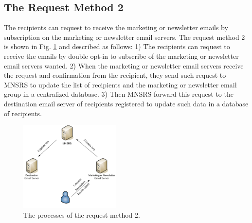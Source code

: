 \documentclass[conference]{IEEEtran}
\begin{document}
\subsection{The Request Method 2}
The recipients can request to receive the marketing or newsletter emails by subscription on the marketing or newsletter email servers.
The request method 2 is
shown in Fig. \ref{fig:Method2Process} and described as follows:
1) The recipients can request to receive the emails by double opt-in \cite{Allman:DoubleOptIn} to subscribe of the marketing or newsletter email servers wanted.
2) When the marketing or newsletter email servers receive the request and confirmation from the recipient, they send such request to MNSRS to update the list of recipients and the marketing or newsletter email group in a centralized database. 
3) Then MNSRS forward this request to the destination email server of recipients registered to update such data in a database of recipients. 

\begin{figure}
\centering
\includegraphics[width=0.45\textwidth]{3.pdf}
\caption{The processes of the request method 2.}
\label{fig:Method2Process}
\end{figure}
\end{document}
